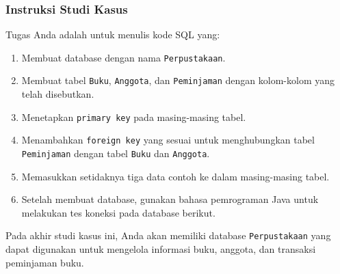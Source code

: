 \subsubsection{Instruksi Studi Kasus}
Tugas Anda adalah untuk menulis kode SQL yang:

\begin{enumerate}
	\item Membuat database dengan nama \texttt{Perpustakaan}.
	\item Membuat tabel \texttt{Buku}, \texttt{Anggota}, dan \texttt{Peminjaman} dengan kolom-kolom yang telah disebutkan.
	\item Menetapkan \texttt{primary key} pada masing-masing tabel.
	\item Menambahkan \texttt{foreign key} yang sesuai untuk menghubungkan tabel \texttt{Peminjaman} dengan tabel \texttt{Buku} dan \texttt{Anggota}.
	\item Memasukkan setidaknya tiga data contoh ke dalam masing-masing tabel.
	\item Setelah membuat database, gunakan bahasa pemrograman Java untuk melakukan tes koneksi pada database berikut.
\end{enumerate}

Pada akhir studi kasus ini, Anda akan memiliki database \texttt{Perpustakaan} yang dapat digunakan untuk mengelola informasi buku, anggota, dan transaksi peminjaman buku.
